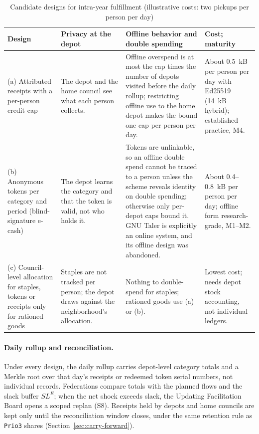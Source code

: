 \documentclass[10pt,twoside,openany]{book}
\theoremstyle{dpepstyle}
\begin{document}
\begin{table}[htbp]
\centering
\caption{Candidate designs for intra-year fulfillment (illustrative costs: two pickups per person per day)}
\label{tab:fulfilment}
\scriptsize
\setlength{\tabcolsep}{3pt}
\begin{tabularx}{\textwidth}{L{1.05in} Y Y L{0.75in}}
\toprule
\textbf{Design} & \textbf{Privacy at the depot} & \textbf{Offline behavior and double spending} & \textbf{Cost; maturity} \\
\midrule
(a) Attributed receipts with a per-person credit cap & The depot and the home council see what each person collects. & Offline overspend is at most the cap times the number of depots visited before the daily rollup; restricting offline use to the home depot makes the bound one cap per person per day. & About 0.5~kB per person per day with Ed25519 (14~kB hybrid); established practice, M4. \\
(b) Anonymous tokens per category and period (blind-signature e-cash) & The depot learns the category and that the token is valid, not who holds it. & Tokens are unlinkable, so an offline double spend cannot be traced to a person unless the scheme reveals identity on double spending; otherwise only per-depot caps bound it. GNU Taler is explicitly an online system, and its offline design was abandoned. & About 0.4--0.8~kB per person per day; offline form research-grade, M1--M2. \\
(c) Council-level allocation for staples, tokens or receipts only for rationed goods & Staples are not tracked per person; the depot draws against the neighborhood's allocation. & Nothing to double-spend for staples; rationed goods use (a) or (b). & Lowest cost; needs depot stock accounting, not individual ledgers. \\
\bottomrule
\end{tabularx}
\par{}
\end{table}

\paragraph{Daily rollup and reconciliation.} Under every design, the daily rollup carries depot-level category totals and a Merkle root over that day's receipts or redeemed token serial numbers, not individual records. Federations compare totals with the planned flows and the slack buffer $SL^E$; when the net shock exceeds slack, the Updating Facilitation Board opens a scoped replan (S8). Receipts held by depots and home councils are kept only until the reconciliation window closes, under the same retention rule as \texttt{Prio3} shares (Section~\ref{sec:carry-forward}).
\end{document}
